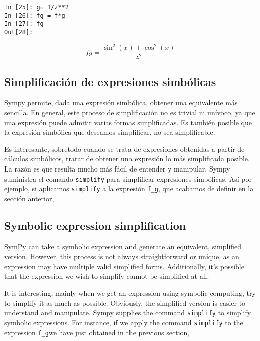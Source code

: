 \begin{center}
	\begin{minipage}{.25\textwidth}
		\begin{verbatim}
In [25]: g= 1/z**2
In [26]: fg = f*g
In [27]: fg
Out[28]:
		\end{verbatim}
	\end{minipage}
	\begin{equation*}
		fg = \frac{\sin^2(x) + \cos^2(x)}{z^2}
	\end{equation*}
\end{center}
\begin{paracol}{2}
\subsection{Simplificación de expresiones simbólicas}
Sympy permite, dada una expresión simbólica, obtener una equivalente más sencilla. En general, este proceso de simplificación no es trivial ni unívoco, ya que una expresión puede admitir varias formas simplificadas. Es también posible que la expresión simbólica que deseamos simplificar, no sea simplificable.

Es interesante, sobretodo cuando se trata de expresiones obtenidas a partir de cálculos simbólicos, tratar de obtener una expresión lo más simplificada posible. La razón es que resulta mucho más fácil de entender y manipular. Sympy suministra el comando \texttt{simplify} para simplificar expresiones simbólicas. Así por ejemplo, si aplicamos \texttt{simplify} a la expresión \texttt{f\_g}, que acabamos de definir en la sección anterior, 
\switchcolumn
\subsection{Symbolic expression simplification}
SymPy can take a symbolic expression and generate an equivalent, simplified version. However, this process is not always straightforward or unique, as an expression may have multiple valid simplified forms. Additionally, it's possible that the expression we wish to simplify cannot be simplified at all.

It is interesting, mainly when we get an expression using symbolic computing, try to simplify it as much as possible. Obviously, the simplified version is easier to understand and manipulate. Sympy supplies the command \texttt{simplify} to simplify symbolic expressions. For instance, if we apply the command \texttt{simplify} to the expression \texttt{f\_g}we have just obtained in the previous section,
\end{paracol}
